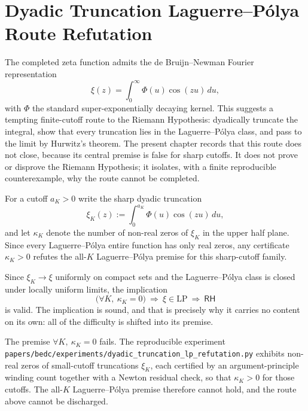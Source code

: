 \chapter{Dyadic Truncation Laguerre--P\'olya Route Refutation}
\label{ch:visions-rh-dyadic-truncation-lp-route-refutation}

The completed zeta function admits the de Bruijn--Newman Fourier
representation
$$
\xi(z)=\int_0^{\infty}\Phi(u)\cos(zu)\,du,
$$
with $\Phi$ the standard super-exponentially decaying kernel. This suggests a
tempting finite-cutoff route to the Riemann Hypothesis: dyadically truncate
the integral, show that every truncation lies in the Laguerre--P\'olya class,
and pass to the limit by Hurwitz's theorem. The present chapter records that
this route does not close, because its central premise is false for sharp
cutoffs. It does not prove or disprove the Riemann Hypothesis; it isolates,
with a finite reproducible counterexample, why the route cannot be completed.

\begin{definition}
\label{def:rh-dyadic-sharp-truncation}
For a cutoff $a_K>0$ write the sharp dyadic truncation
$$
\xi_K(z):=\int_0^{a_K}\Phi(u)\cos(zu)\,du,
$$
and let $\kappa_K$ denote the number of non-real zeros of $\xi_K$ in the upper
half plane. Since every Laguerre--P\'olya entire function has only real zeros,
any certificate $\kappa_K>0$ refutes the all-$K$ Laguerre--P\'olya premise for
this sharp-cutoff family.
\end{definition}

\begin{principle}
\label{prin:rh-dyadic-hurwitz-bridge}
Since $\xi_K\to\xi$ uniformly on compact sets and the Laguerre--P\'olya class is
closed under locally uniform limits, the implication
$$
\bigl(\forall K,\ \kappa_K=0\bigr)\ \Rightarrow\ \xi\in\mathrm{LP}\ \Rightarrow\ \mathsf{RH}
$$
is valid. The implication is sound, and that is precisely why it carries no
content on its own: all of the difficulty is shifted into its premise.
\end{principle}

\begin{principle}
\label{prin:rh-dyadic-premise-false}
The premise $\forall K,\ \kappa_K=0$ fails. The reproducible experiment
\texttt{papers/bedc/experiments/dyadic\_truncation\_lp\_refutation.py}
exhibits non-real zeros of small-cutoff truncations $\xi_K$, each certified by
an argument-principle winding count together with a Newton residual check, so
that $\kappa_K>0$ for those cutoffs. The all-$K$ Laguerre--P\'olya premise
therefore cannot hold, and the route above cannot be discharged.
\end{principle}

